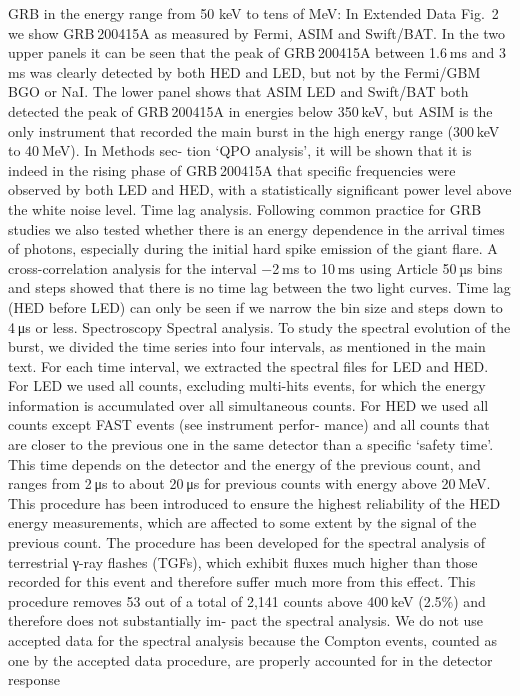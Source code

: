 GRB in the energy range from 50 keV to tens of MeV: In Extended Data
Fig. 2 we show GRB 200415A as measured by Fermi, ASIM and Swift/BAT.
In the two upper panels it can be seen that the peak of GRB 200415A
between 1.6 ms and 3 ms was clearly detected by both HED and LED,
but not by the Fermi/GBM BGO or NaI. The lower panel shows that ASIM
LED and Swift/BAT both detected the peak of GRB 200415A in energies
below 350 keV, but ASIM is the only instrument that recorded the main
burst in the high energy range (300 keV to 40 MeV). In Methods sec-
tion ‘QPO analysis’, it will be shown that it is indeed in the rising phase
of GRB 200415A that specific frequencies were observed by both LED
and HED, with a statistically significant power level above the white
noise level.
Time lag analysis. Following common practice for GRB studies we also
tested whether there is an energy dependence in the arrival times of
photons, especially during the initial hard spike emission of the giant
flare. A cross-correlation analysis for the interval −2 ms to 10 ms using
Article
50 µs bins and steps showed that there is no time lag between the two
light curves. Time lag (HED before LED) can only be seen if we narrow
the bin size and steps down to 4 μs or less.
Spectroscopy
Spectral analysis. To study the spectral evolution of the burst, we
divided the time series into four intervals, as mentioned in the main
text. For each time interval, we extracted the spectral files for LED and
HED. For LED we used all counts, excluding multi-hits events, for which
the energy information is accumulated over all simultaneous counts.
For HED we used all counts except FAST events (see instrument perfor-
mance) and all counts that are closer to the previous one in the same
detector than a specific ‘safety time’. This time depends on the detector
and the energy of the previous count, and ranges from 2 μs to about
20 μs for previous counts with energy above 20 MeV. This procedure
has been introduced to ensure the highest reliability of the HED energy
measurements, which are affected to some extent by the signal of the
previous count. The procedure has been developed for the spectral
analysis of terrestrial γ-ray flashes (TGFs), which exhibit fluxes much
higher than those recorded for this event and therefore suffer much
more from this effect. This procedure removes 53 out of a total of 2,141
counts above 400 keV (2.5\%) and therefore does not substantially im-
pact the spectral analysis. We do not use accepted data for the spectral
analysis because the Compton events, counted as one by the accepted
data procedure, are properly accounted for in the detector response
